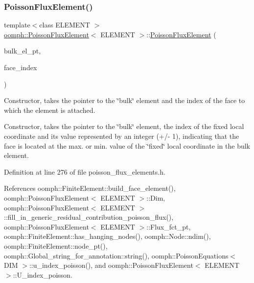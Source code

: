 \subsubsection{\texorpdfstring{Poisson\+Flux\+Element()}{PoissonFluxElement()}\hspace{0.1cm}{\footnotesize\ttfamily [1/3]}}
{\footnotesize\ttfamily template$<$class E\+L\+E\+M\+E\+NT $>$ \\
\hyperlink{classoomph_1_1PoissonFluxElement}{oomph\+::\+Poisson\+Flux\+Element}$<$ E\+L\+E\+M\+E\+NT $>$\+::\hyperlink{classoomph_1_1PoissonFluxElement}{Poisson\+Flux\+Element} (\begin{DoxyParamCaption}\item[{\hyperlink{classoomph_1_1FiniteElement}{Finite\+Element} $\ast$const \&}]{bulk\+\_\+el\+\_\+pt,  }\item[{const int \&}]{face\+\_\+index }\end{DoxyParamCaption})}



Constructor, takes the pointer to the \char`\"{}bulk\char`\"{} element and the index of the face to which the element is attached. 

Constructor, takes the pointer to the \char`\"{}bulk\char`\"{} element, the index of the fixed local coordinate and its value represented by an integer (+/-\/ 1), indicating that the face is located at the max. or min. value of the \char`\"{}fixed\char`\"{} local coordinate in the bulk element. 

Definition at line 276 of file poisson\+\_\+flux\+\_\+elements.\+h.



References oomph\+::\+Finite\+Element\+::build\+\_\+face\+\_\+element(), oomph\+::\+Poisson\+Flux\+Element$<$ E\+L\+E\+M\+E\+N\+T $>$\+::\+Dim, oomph\+::\+Poisson\+Flux\+Element$<$ E\+L\+E\+M\+E\+N\+T $>$\+::fill\+\_\+in\+\_\+generic\+\_\+residual\+\_\+contribution\+\_\+poisson\+\_\+flux(), oomph\+::\+Poisson\+Flux\+Element$<$ E\+L\+E\+M\+E\+N\+T $>$\+::\+Flux\+\_\+fct\+\_\+pt, oomph\+::\+Finite\+Element\+::has\+\_\+hanging\+\_\+nodes(), oomph\+::\+Node\+::ndim(), oomph\+::\+Finite\+Element\+::node\+\_\+pt(), oomph\+::\+Global\+\_\+string\+\_\+for\+\_\+annotation\+::string(), oomph\+::\+Poisson\+Equations$<$ D\+I\+M $>$\+::u\+\_\+index\+\_\+poisson(), and oomph\+::\+Poisson\+Flux\+Element$<$ E\+L\+E\+M\+E\+N\+T $>$\+::\+U\+\_\+index\+\_\+poisson.

\mbox{\label{classoomph_1_1PoissonFluxElement_a137480da853112a2180a9eafb30ace49}} 
